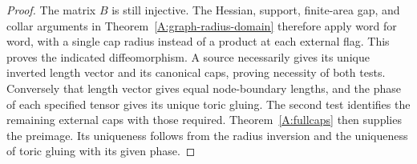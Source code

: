 \begin{proof}
The matrix $B$ is still injective. The Hessian, support, finite-area
gap, and collar arguments in Theorem~\ref{A:graph-radius-domain}
therefore apply word for word, with a single cap radius instead of a
product at each external flag. This proves the indicated
diffeomorphism. A source necessarily gives its unique inverted
length vector and its canonical caps, proving necessity of both
tests. Conversely that length vector gives equal node-boundary
lengths, and the phase of each specified tensor gives its unique
toric gluing. The second test identifies the remaining external
caps with those required. Theorem~\ref{A:fullcaps} then supplies
the preimage. Its uniqueness follows from the radius inversion
and the uniqueness of toric gluing with its given phase.
\end{proof}

